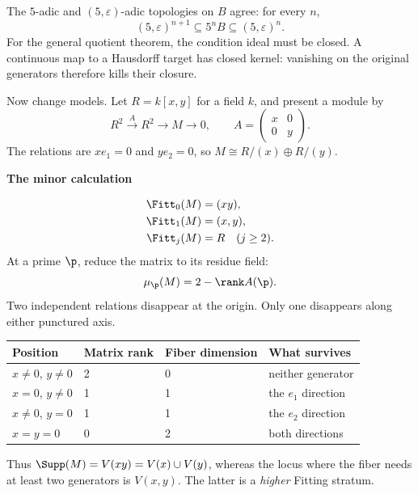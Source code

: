 The $5$-adic and $(5,\varepsilon)$-adic topologies on $B$ agree: for every $n$,
\[
(5,\varepsilon)^{n+1}\subseteq 5^nB\subseteq(5,\varepsilon)^n.
\]
For the general quotient theorem, the condition ideal must be closed. A continuous map to a Hausdorff target has closed kernel: vanishing on the original generators therefore kills their closure.



Now change models. Let $R=k[x,y]$ for a field $k$, and present a module by
\[
R^2\xrightarrow{A}R^2\longrightarrow M\longrightarrow0,
\qquad
A=\begin{pmatrix}x&0\\0&y\end{pmatrix}.
\]
The relations are $xe_1=0$ and $ye_2=0$, so $M\cong R/(x)\oplus R/(y)$.

\begin{minipage}[c]{.48\linewidth}
\end{minipage}\hfill
\begin{minipage}[c]{.48\linewidth}
{\sffamily\bfseries The minor calculation}\par
\[
\begin{aligned}
\Fitt_0(M)&=(xy),\\
\Fitt_1(M)&=(x,y),\\
\Fitt_j(M)&=R\quad(j\ge2).
\end{aligned}
\]
At a prime $\p$, reduce the matrix to its residue field:
\[
\mu_{\p}(M)=2-\rank A(\p).
\]
Two independent relations disappear at the origin. Only one disappears along either punctured axis.
\end{minipage}

\begin{center}\small
\begin{tabular}{@{}llll@{}}\toprule
Position & Matrix rank & Fiber dimension & What survives\\\midrule
$x\ne0$, $y\ne0$ & 2 & 0 & neither generator\\
$x=0$, $y\ne0$ & 1 & 1 & the $e_1$ direction\\
$x\ne0$, $y=0$ & 1 & 1 & the $e_2$ direction\\
$x=y=0$ & 0 & 2 & both directions\\\bottomrule
\end{tabular}
\end{center}
Thus $\Supp(M)=V(xy)=V(x)\cup V(y)$, whereas the locus where the fiber needs at least two generators is $V(x,y)$. The latter is a \emph{higher} Fitting stratum.

